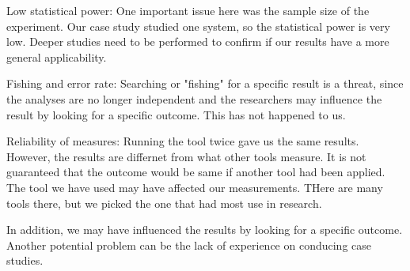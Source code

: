 Low statistical power: One important issue here was the sample size of the experiment. Our case study studied one system, so the statistical power is very low. Deeper studies need to be performed to confirm if our results have a more general applicability.

Fishing and error rate: Searching or "fishing" for a specific result is a threat, since the analyses are no longer independent and the researchers may influence the result by looking for a specific outcome. This has not happened to us. 

Reliability of measures: Running the tool twice gave us the same results. However, the results are differnet from what other tools measure. It is not guaranteed that the outcome would be same if another tool had been applied. The tool we have used may have affected our measurements. THere are many tools there, but we picked the one that had most use in research.


 In addition, we may have influenced the results by looking for a specific outcome. Another potential problem can be the lack of experience on conducing case studies.













